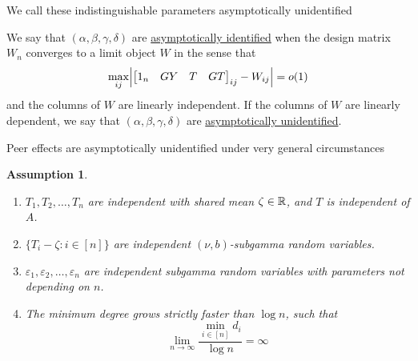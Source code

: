 \documentclass[aspectratio=169]{beamer}
\newtheorem{assumption}{Assumption}
\theoremstyle{remark}
\begin{document}
\begin{frame}{We call these indistinguishable parameters asymptotically unidentified}
    \begin{definition}
        We say that $(\alpha, \beta, \gamma, \delta)$ are \underline{asymptotically identified} when the design matrix $W_n$ converges to a limit object $W$ in the sense that
        \begin{equation*}
            \max_{ij} \abs*{
            \begin{bmatrix} 1_n & GY & T & GT \end{bmatrix}_{ij} - W_{ij}
            } = o(1)
        \end{equation*}
        and the columns of $W$ are linearly independent. If the columns of $W$ are linearly dependent, we say that $(\alpha, \beta, \gamma, \delta)$ are \underline{asymptotically unidentified}.
    \end{definition}
\end{frame}

\begin{frame}{Peer effects are asymptotically unidentified under very general circumstances}
    \begin{assumption}
        \begin{enumerate}
            \item $T_1,T_2,\dots,T_n$ are independent with shared mean $\zeta \in \mathbb{R}$, and $T$ is independent of $A$.
            \item $\{ T_i - \zeta : i \in [n] \}$ are independent $(\nu,b)$-subgamma random variables.
            \item $\varepsilon_1, \varepsilon_2, \dots, \varepsilon_n$ are independent subgamma random variables with parameters not depending on $n$.
            \item The minimum degree grows strictly faster than $\log n$, such that
                  \begin{equation*}
                      \lim_{n \to \infty} \frac{\min_{i \in [n]} d_i}{\log n} = \infty
                  \end{equation*}
        \end{enumerate}
    \end{assumption}
\end{frame}
\end{document}
